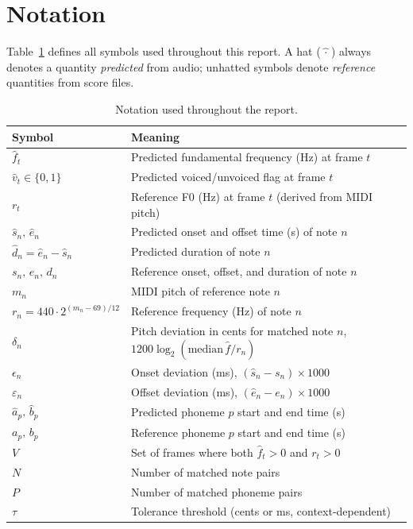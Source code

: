 \documentclass[11pt,letterpaper]{article}
\newcommand{\fh}{\hat{f}}
\newcommand{\vh}{\hat{v}}
\newcommand{\sh}{\hat{s}}
\newcommand{\eh}{\hat{e}}
\newcommand{\ah}{\hat{a}}
\newcommand{\bh}{\hat{b}}
\newcommand{\dh}{\hat{d}}
\begin{document}
\section{Notation}

Table~\ref{tab:notation} defines all symbols used throughout this report.
A hat ($\hat{\,\cdot\,}$) always denotes a quantity \emph{predicted} from
audio; unhatted symbols denote \emph{reference} quantities from score files.

\begin{table}[h]
  \centering
  \caption{Notation used throughout the report.}
  \label{tab:notation}
  \renewcommand{\arraystretch}{1.3}
  \begin{tabular}{@{}lp{11cm}@{}}
    \toprule
    Symbol & Meaning \\
    \midrule
    $\fh_t$                & Predicted fundamental frequency (Hz) at frame $t$ \\
    $\vh_t \in \{0,1\}$   & Predicted voiced/unvoiced flag at frame $t$ \\
    $r_t$                  & Reference F0 (Hz) at frame $t$ (derived from MIDI pitch) \\
    $\sh_n,\,\eh_n$        & Predicted onset and offset time (s) of note $n$ \\
    $\dh_n = \eh_n-\sh_n$ & Predicted duration of note $n$ \\
    $s_n,\,e_n,\,d_n$     & Reference onset, offset, and duration of note $n$ \\
    $m_n$                  & MIDI pitch of reference note $n$ \\
    $r_n = 440\cdot 2^{(m_n-69)/12}$ & Reference frequency (Hz) of note $n$ \\
    $\delta_n$             & Pitch deviation in cents for matched note $n$,
                             $1200\log_2(\text{median}\,\fh / r_n)$ \\
    $\epsilon_n$           & Onset deviation (ms), $(\sh_n - s_n)\times 1000$ \\
    $\varepsilon_n$        & Offset deviation (ms), $(\eh_n - e_n)\times 1000$ \\
    $\ah_p,\,\bh_p$        & Predicted phoneme $p$ start and end time (s) \\
    $a_p,\,b_p$            & Reference phoneme $p$ start and end time (s) \\
    $V$                    & Set of frames where both $\fh_t > 0$ and $r_t > 0$ \\
    $N$                    & Number of matched note pairs \\
    $P$                    & Number of matched phoneme pairs \\
    $\tau$                 & Tolerance threshold (cents or ms, context-dependent) \\
    \bottomrule
  \end{tabular}
\end{table}
\end{document}
